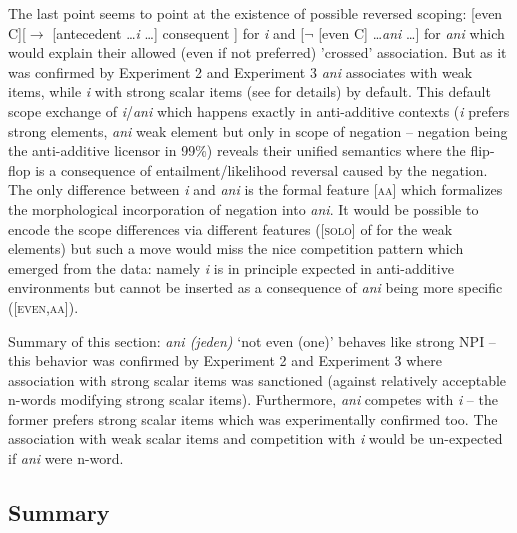 \documentclass[output=paper,
]{langscibook}
\begin{document}
\noindent The last point seems to point at the existence of possible reversed scoping: [even C][$\rightarrow$ [antecedent \ldots \textit{i} \ldots] consequent ] for \textit{i} and  [$\neg$ [even C] \ldots \textit{ani} \ldots] for \textit{ani} which would explain their allowed (even if not preferred) 'crossed' association. But as it was confirmed by Experiment 2 and Experiment 3 \textit{ani} associates with weak items, while \textit{i} with strong scalar items (see \citealt{docekalsafratovaoli} for details) by default. This default scope exchange of \textit{i}/\textit{ani} which happens exactly in anti-additive contexts (\textit{i} prefers strong elements, \textit{ani} weak element but only in scope of negation -- negation being the anti-additive licensor in 99\%) reveals their unified semantics where the flip-flop is a consequence of entailment/likelihood reversal caused by the negation. The only difference between \textit{i} and \textit{ani} is the formal feature [\textsc{aa}] which formalizes the morphological incorporation of negation into \textit{ani}.  It would be possible to encode the scope differences via different features ([\textsc{solo}] of \citealt{crnic2011getting} for the weak elements) but such a move would miss the nice competition pattern which emerged from the data: namely \textit{i} is in principle expected in anti-additive environments but cannot be inserted as a consequence of \textit{ani} being more specific ([\textsc{even,aa}]).

Summary of this section: \textit{ani (jeden)} `not even (one)' behaves like strong NPI -- this behavior was confirmed by Experiment 2 and Experiment 3 where association with strong scalar items was sanctioned (against relatively acceptable n-words modifying strong scalar items). Furthermore, \textit{ani} competes with \textit{i} -- the former prefers strong scalar items which was experimentally confirmed too. The association with weak scalar items and competition with \textit{i} would be un-expected if \textit{ani} were n-word.

\subsection{Summary}\label{summary}
\end{document}

